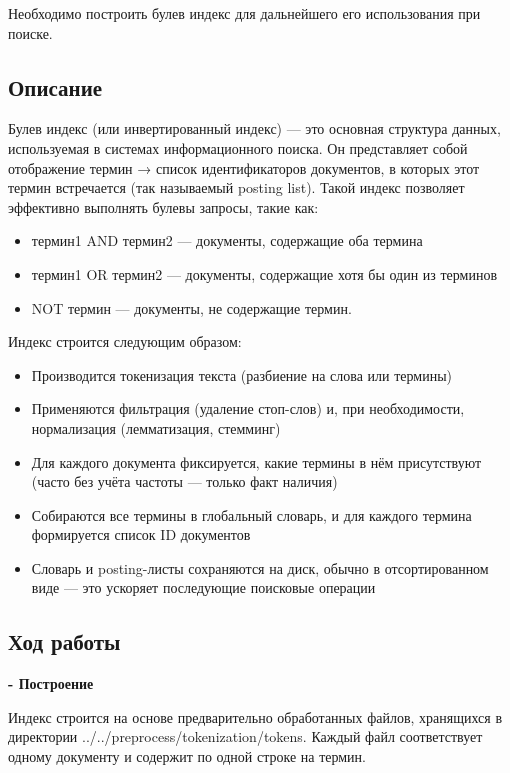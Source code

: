 \documentclass[pdf, unicode, 12pt, a4paper, oneside, fleqn]{article}
\begin{document}
Необходимо построить булев индекс для дальнейшего его использования при поиске.

\subsection*{Описание}
Булев индекс (или инвертированный индекс) — это основная структура данных, используемая в системах информационного поиска. Он представляет собой отображение термин → список идентификаторов документов, в которых этот термин встречается (так называемый posting list). Такой индекс позволяет эффективно выполнять булевы запросы, такие как:
\begin{itemize}
    \item термин1 AND термин2 — документы, содержащие оба термина
    \item термин1 OR термин2 — документы, содержащие хотя бы один из терминов
    \item NOT термин — документы, не содержащие термин.
\end{itemize}
Индекс строится следующим образом:
\begin{itemize}
    \item Производится токенизация текста (разбиение на слова или термины)
    \item Применяются фильтрация (удаление стоп-слов) и, при необходимости, нормализация (лемматизация, стемминг)
    \item Для каждого документа фиксируется, какие термины в нём присутствуют (часто без учёта частоты — только факт наличия)
    \item Собираются все термины в глобальный словарь, и для каждого термина формируется список ID документов
    \item Словарь и posting-листы сохраняются на диск, обычно в отсортированном виде — это ускоряет последующие поисковые операции
\end{itemize}

\subsection*{Ход работы}

\textbf{- Построение} 

Индекс строится на основе предварительно обработанных файлов, хранящихся в директории ../../preprocess/tokenization/tokens. 
Каждый файл соответствует одному документу и содержит по одной строке на термин.
\end{document}
